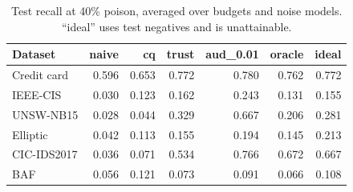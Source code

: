 \begin{table}[t]
\caption{Test recall at 40\% poison, averaged over budgets and noise models. ``ideal'' uses test negatives and is unattainable.}\label{tab:recall}
\centering\small
\begin{tabular}{lrrrrrr}
\toprule
Dataset & naive & cq & trust & aud\_0.01 & oracle & ideal \\
\midrule
Credit card & 0.596 & 0.653 & 0.772 & 0.780 & 0.762 & 0.772 \\
IEEE-CIS & 0.030 & 0.123 & 0.162 & 0.243 & 0.131 & 0.155 \\
UNSW-NB15 & 0.028 & 0.044 & 0.329 & 0.667 & 0.206 & 0.281 \\
Elliptic & 0.042 & 0.113 & 0.155 & 0.194 & 0.145 & 0.213 \\
CIC-IDS2017 & 0.036 & 0.071 & 0.534 & 0.766 & 0.672 & 0.667 \\
BAF & 0.056 & 0.121 & 0.073 & 0.091 & 0.066 & 0.108 \\
\bottomrule
\end{tabular}
\end{table}
